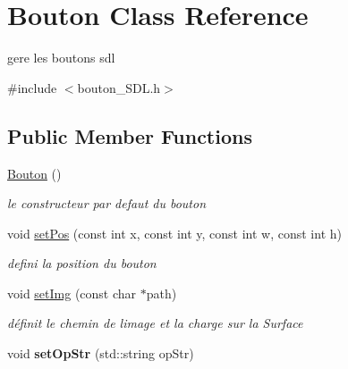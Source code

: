 \hypertarget{classBouton}{}\section{Bouton Class Reference}
\label{classBouton}


gere les boutons sdl  




{\ttfamily \#include $<$bouton\+\_\+\+S\+D\+L.\+h$>$}

\subsection*{Public Member Functions}
\begin{DoxyCompactItemize}
\item 
\hyperlink{classBouton_ad1e4f684cad81db47393df0be7a65658}{Bouton} ()\hypertarget{classBouton_ad1e4f684cad81db47393df0be7a65658}{}\label{classBouton_ad1e4f684cad81db47393df0be7a65658}

\begin{DoxyCompactList}\small\item\em le constructeur par defaut du bouton \end{DoxyCompactList}\item 
void \hyperlink{classBouton_aef95e8d562a824daa6809729c43043d8}{set\+Pos} (const int x, const int y, const int w, const int h)\hypertarget{classBouton_aef95e8d562a824daa6809729c43043d8}{}\label{classBouton_aef95e8d562a824daa6809729c43043d8}

\begin{DoxyCompactList}\small\item\em defini la position du bouton \end{DoxyCompactList}\item 
void \hyperlink{classBouton_a5dd79fc7f734dac01c4421b4510a76c5}{set\+Img} (const char $\ast$path)\hypertarget{classBouton_a5dd79fc7f734dac01c4421b4510a76c5}{}\label{classBouton_a5dd79fc7f734dac01c4421b4510a76c5}

\begin{DoxyCompactList}\small\item\em définit le chemin de l\textquotesingle{}image et la charge sur la Surface \end{DoxyCompactList}\item 
void {\bfseries set\+Op\+Str} (std\+::string op\+Str)\hypertarget{classBouton_aba23ac631d6137a15c5c9fef776ded60}{}\label{classBouton_aba23ac631d6137a15c5c9fef776ded60}


\end{DoxyCompactItemize}
